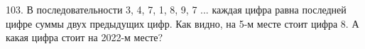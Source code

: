 103. В последовательности 3, 4, 7, 1, 8, 9, 7 ... каждая цифра равна последней цифре суммы двух предыдущих цифр. Как видно, на 5-м месте стоит цифра 8. А какая цифра стоит на 2022-м месте?\\
